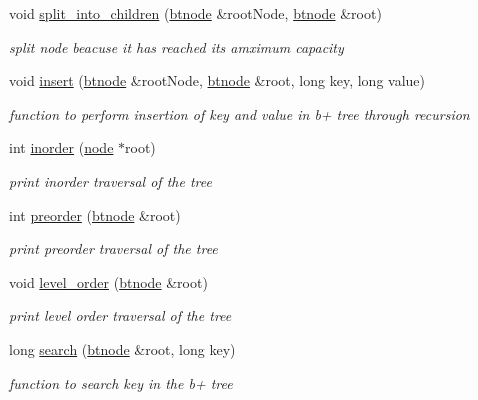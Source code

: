 \begin{DoxyCompactItemize}
void \hyperlink{class_btree_1_1btree_a13f3ff9a375a84f3866b49fcb241a79c}{split\-\_\-into\-\_\-children} (\hyperlink{namespace_btree_af2177a710b4e16aaf0c14dcbbc01a9af}{btnode} \&root\-Node, \hyperlink{namespace_btree_af2177a710b4e16aaf0c14dcbbc01a9af}{btnode} \&root)
\begin{DoxyCompactList}\small\item\em split node beacuse it has reached its amximum capacity \end{DoxyCompactList}\item 
void \hyperlink{class_btree_1_1btree_a687d442d845e0dd437e692bf2e5576ea}{insert} (\hyperlink{namespace_btree_af2177a710b4e16aaf0c14dcbbc01a9af}{btnode} \&root\-Node, \hyperlink{namespace_btree_af2177a710b4e16aaf0c14dcbbc01a9af}{btnode} \&root, long key, long value)
\begin{DoxyCompactList}\small\item\em function to perform insertion of key and value in b+ tree through recursion \end{DoxyCompactList}\item 
int \hyperlink{class_btree_1_1btree_a94e1958a92e2c2d4cb1615f110c05189}{inorder} (\hyperlink{class_btree_1_1node}{node} $\ast$root)
\begin{DoxyCompactList}\small\item\em print inorder traversal of the tree \end{DoxyCompactList}\item 
int \hyperlink{class_btree_1_1btree_a37f1cc5d7ac107e32e57ffee28b00128}{preorder} (\hyperlink{namespace_btree_af2177a710b4e16aaf0c14dcbbc01a9af}{btnode} \&root)
\begin{DoxyCompactList}\small\item\em print preorder traversal of the tree \end{DoxyCompactList}\item 
void \hyperlink{class_btree_1_1btree_a1b419762450195b62f8508f2dc76c41b}{level\-\_\-order} (\hyperlink{namespace_btree_af2177a710b4e16aaf0c14dcbbc01a9af}{btnode} \&root)
\begin{DoxyCompactList}\small\item\em print level order traversal of the tree \end{DoxyCompactList}\item 
long \hyperlink{class_btree_1_1btree_a42b495322ab4ce3af6ac25f95453eaaa}{search} (\hyperlink{namespace_btree_af2177a710b4e16aaf0c14dcbbc01a9af}{btnode} \&root, long key)
\begin{DoxyCompactList}\small\item\em function to search key in the b+ tree \end{DoxyCompactList}\end{DoxyCompactItemize}
